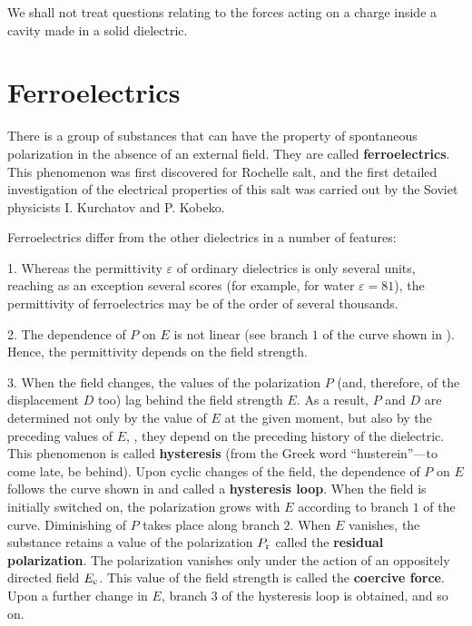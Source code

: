 We shall not treat questions relating to the forces acting on a charge inside a cavity made in a solid dielectric.

\section{Ferroelectrics}\label{sec:2_9}

There is a group of substances that can have the property of spontaneous polarization in the absence of an external field. They are called \textbf{ferroelectrics}. This phenomenon was first discovered for Rochelle salt, and the first detailed investigation of the electrical properties of this salt was carried out by the Soviet physicists I. Kurchatov and P. Kobeko.

Ferroelectrics differ from the other dielectrics in a number of features:

1. Whereas the permittivity $\varepsilon$ of ordinary dielectrics is only several units, reaching as an exception several scores (for example, for water $\varepsilon=81$), the permittivity of ferroelectrics may be of the order of several thousands.

2. The dependence of $P$ on $E$ is not linear (see branch $1$ of the curve shown in ). Hence, the permittivity depends on the field strength.

3. When the field changes, the values of the polarization $P$ (and, therefore, of the displacement $D$ too) lag behind the field strength $E$. As a result, $P$ and $D$ are determined not only by the value of $E$ at the given moment, but also by the preceding values of $E$, \ie, they depend on the preceding history of the dielectric. This phenomenon is called \textbf{hysteresis} (from the Greek word ``husterein''---to come late, be behind). Upon cyclic changes of the field, the dependence of $P$ on $E$ follows the curve shown in  and called a \textbf{hysteresis loop}.
When the field is initially switched on, the polarization grows with $E$ according to branch $1$ of the curve. Diminishing of $P$ takes place along branch $2$. When $E$ vanishes, the substance retains a value of the polarization $P_{\text{r}}$ called the \textbf{residual polarization}. The polarization vanishes only under the action of an oppositely directed field $E_{\text{c}}$. This value of the field strength is called the \textbf{coercive force}. Upon a further change in $E$, branch $3$ of the hysteresis loop is obtained, and so on.

